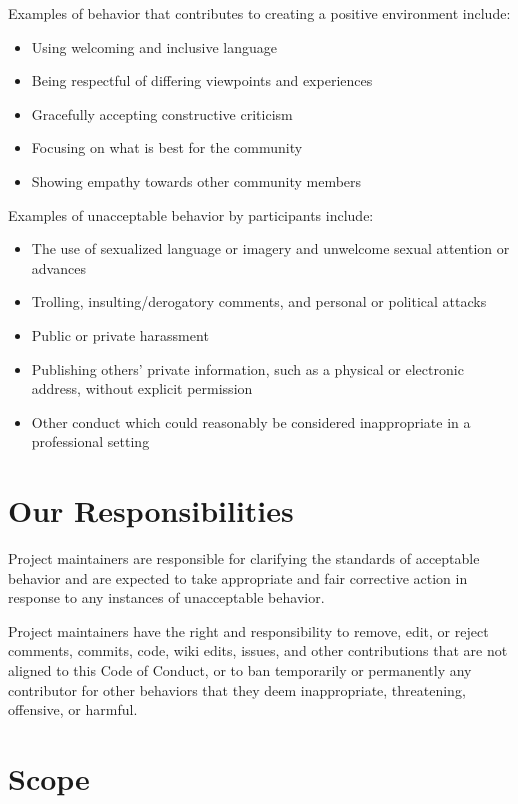 \documentclass[
  letterpaper,
  oneside,
  open=any]{scrbook}
\providecommand{\tightlist}{%
  \setlength{\itemsep}{0pt}\setlength{\parskip}{0pt}}\usepackage{longtable,booktabs,array}
\begin{document}
Examples of behavior that contributes to creating a positive environment
include:

\begin{itemize}
\tightlist
\item
  Using welcoming and inclusive language
\item
  Being respectful of differing viewpoints and experiences
\item
  Gracefully accepting constructive criticism
\item
  Focusing on what is best for the community
\item
  Showing empathy towards other community members
\end{itemize}

Examples of unacceptable behavior by participants include:

\begin{itemize}
\tightlist
\item
  The use of sexualized language or imagery and unwelcome sexual
  attention or advances
\item
  Trolling, insulting/derogatory comments, and personal or political
  attacks
\item
  Public or private harassment
\item
  Publishing others' private information, such as a physical or
  electronic address, without explicit permission
\item
  Other conduct which could reasonably be considered inappropriate in a
  professional setting
\end{itemize}

\hypertarget{our-responsibilities}{%
\section{Our Responsibilities}\label{our-responsibilities}}

Project maintainers are responsible for clarifying the standards of
acceptable behavior and are expected to take appropriate and fair
corrective action in response to any instances of unacceptable behavior.

Project maintainers have the right and responsibility to remove, edit,
or reject comments, commits, code, wiki edits, issues, and other
contributions that are not aligned to this Code of Conduct, or to ban
temporarily or permanently any contributor for other behaviors that they
deem inappropriate, threatening, offensive, or harmful.

\hypertarget{scope}{%
\section{Scope}\label{scope}}
\end{document}
